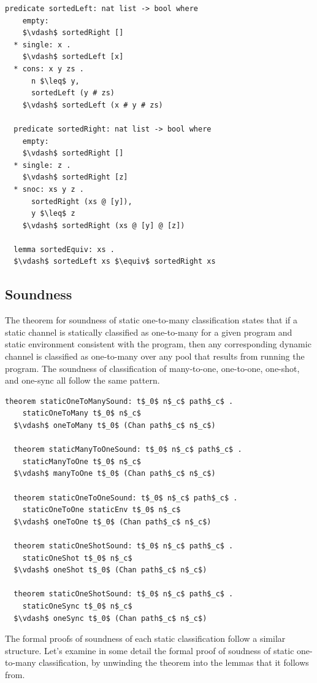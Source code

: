 \documentclass[letterpaper, 11pt]{extarticle}
\begin{document}
\begin{lstlisting}[language=logic, mathescape]
  predicate sortedLeft: nat list -> bool where
    empty:
    $\vdash$ sortedRight []
  * single: x .
    $\vdash$ sortedLeft [x]
  * cons: x y zs .
      n $\leq$ y,
      sortedLeft (y # zs)
    $\vdash$ sortedLeft (x # y # zs)

  predicate sortedRight: nat list -> bool where
    empty:
    $\vdash$ sortedRight []
  * single: z .
    $\vdash$ sortedRight [z]
  * snoc: xs y z .
      sortedRight (xs @ [y]),
      y $\leq$ z 
    $\vdash$ sortedRight (xs @ [y] @ [z])

  lemma sortedEquiv: xs .
  $\vdash$ sortedLeft xs $\equiv$ sortedRight xs  
\end{lstlisting}

\subsection{Soundness}

The theorem for soundness of static one-to-many classification states that if a static channel is
statically classified as one-to-many for a given program and
static environment consistent with the
program, then any corresponding dynamic channel is classified
as one-to-many over any pool that results
from running the program. The soundness of classification of many-to-one, one-to-one, one-shot, and one-sync
all follow the same pattern.

\begin{lstlisting}[language=logic, mathescape]
  theorem staticOneToManySound: t$_0$ n$_c$ path$_c$ . 
    staticOneToMany t$_0$ n$_c$
  $\vdash$ oneToMany t$_0$ (Chan path$_c$ n$_c$)

  theorem staticManyToOneSound: t$_0$ n$_c$ path$_c$ . 
    staticManyToOne t$_0$ n$_c$
  $\vdash$ manyToOne t$_0$ (Chan path$_c$ n$_c$)

  theorem staticOneToOneSound: t$_0$ n$_c$ path$_c$ . 
    staticOneToOne staticEnv t$_0$ n$_c$
  $\vdash$ oneToOne t$_0$ (Chan path$_c$ n$_c$)

  theorem staticOneShotSound: t$_0$ n$_c$ path$_c$ .
    staticOneShot t$_0$ n$_c$
  $\vdash$ oneShot t$_0$ (Chan path$_c$ n$_c$)

  theorem staticOneShotSound: t$_0$ n$_c$ path$_c$ .
    staticOneSync t$_0$ n$_c$
  $\vdash$ oneSync t$_0$ (Chan path$_c$ n$_c$)
\end{lstlisting}

The formal proofs of soundness of each static classification follow a similar structure.
Let's examine in some detail the formal proof of soudness of static one-to-many classification,
by unwinding the theorem into the lemmas that it follows from.
\end{document}

